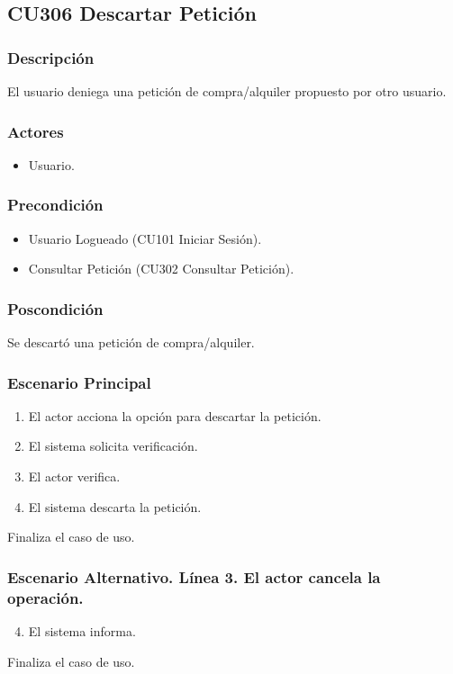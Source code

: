\subsection{CU306 Descartar Petici\'{o}n}
\subsubsection{Descripci\'{o}n}
El usuario deniega una petici\'{o}n de compra/alquiler propuesto por otro usuario.
\subsubsection{Actores}
\begin{itemize}
\item Usuario.
\end{itemize}
\subsubsection{Precondici\'{o}n}
\begin{itemize}
\item Usuario Logueado (CU101 Iniciar Sesi\'{o}n).
\item Consultar Petici\'{o}n (CU302 Consultar Petici\'{o}n).
\end{itemize}
\subsubsection{Poscondici\'{o}n}
Se descart\'{o} una petici\'{o}n de compra/alquiler.
\subsubsection{Escenario Principal}
\begin{enumerate}
\item El actor acciona la opci\'{o}n para descartar la petici\'{o}n.
\item El sistema solicita verificaci\'{o}n.
\item El actor verifica.
\item El sistema descarta la petici\'{o}n.
\end{enumerate}
Finaliza el caso de uso.
\subsubsection{Escenario Alternativo. L\'{i}nea 3. El actor cancela la operaci\'{o}n.}
\begin{enumerate}
\setcounter{enumi}{3}
\item El sistema informa.
\end{enumerate}
Finaliza el caso de uso.